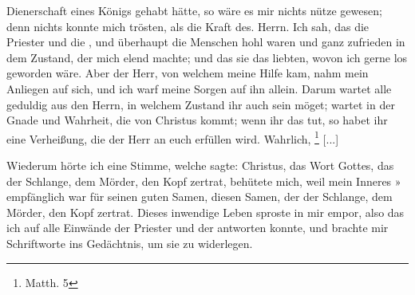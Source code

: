 Dienerschaft eines Königs gehabt hätte, so wäre es mir nichts
nütze gewesen; denn nichts konnte mich trösten, als die Kraft
des. Herrn. Ich sah, das die Priester und die ,
und überhaupt die Menschen hohl waren und ganz zufrieden
in dem Zustand, der mich elend machte; und das sie das
liebten, wovon ich gerne los geworden wäre. Aber der Herr,
von welchem meine Hilfe kam, nahm mein Anliegen auf sich, und
ich warf meine Sorgen auf ihn allein. Darum wartet alle 
geduldig aus den Herrn, in welchem Zustand ihr auch sein möget;
wartet in der Gnade und Wahrheit, die von Christus kommt;
wenn ihr das tut, so habet ihr eine Verheißung, die der Herr
an euch erfüllen wird. Wahrlich, \footnote{Matth. 5} [...]

Wiederum hörte ich eine Stimme, welche sagte:  Christus, das Wort Gottes, das der Schlange,
dem Mörder, den Kopf zertrat, behütete mich, weil mein Inneres »
empfänglich war für seinen guten Samen, diesen Samen, der der
Schlange, dem Mörder, den Kopf zertrat. Dieses inwendige
Leben sproste in mir empor, also das ich auf alle Einwände der
Priester und der  antworten konnte, und brachte mir
Schriftworte ins Gedächtnis, um sie zu widerlegen.

